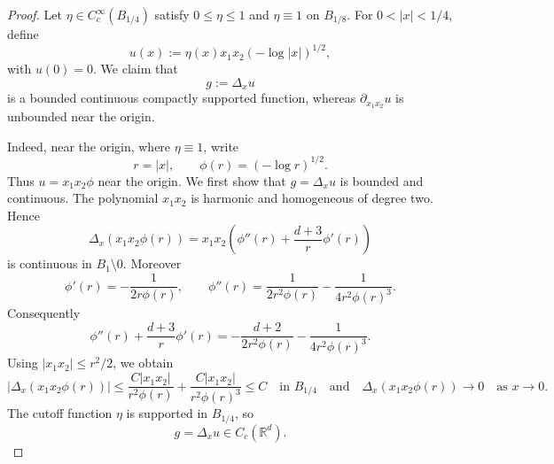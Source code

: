\documentclass[11pt,reqno]{amsart}
\numberwithin{equation}{section}
\theoremstyle{remark}
\newcommand{\R}{\mathbb{R}}
\begin{document}
\begin{proof}
Let \(\eta\in C_c^\infty(B_{1/4})\) satisfy \(0\le\eta\le1\) and
\(\eta\equiv1\) on \(B_{1/8}\).  For \(0<|x|<1/4\), %
define
\begin{equation}\label{eq:potential-u-def}
   u(x):=\eta(x)x_1x_2 (-\log |x|)^{1/2},
\end{equation}
with \(u(0)=0\).  We claim that
\[
   g:=\Delta_x u
\]
is a bounded {continuous} compactly supported function, whereas \(\partial_{x_1x_2}u\) is
unbounded near the origin.

Indeed, near the origin, where \(\eta\equiv1\), write
\[
   r=|x|,
   \qquad
   \phi(r)=(-\log r)^{1/2}.
\]
Thus \(u=x_1x_2\phi\) near the origin.  We first show that
\(g=\Delta_xu\) is bounded {and continuous}.  The polynomial \(x_1x_2\) is harmonic and homogeneous
of degree two.  Hence
\begin{equation}\label{eq:laplacian-Pphi}
   \Delta_x(x_1x_2\phi(r))
   =x_1x_2\left(\phi''(r)+\frac{d+3}{r}\phi'(r)\right)
\end{equation}
is continuous in $B_1\setminus{0}$.
Moreover
\[
   \phi'(r)=-\frac{1}{2r\phi(r)},
   \qquad
   \phi''(r)=\frac{1}{2r^2\phi(r)}
      -\frac{1}{4r^2\phi(r)^3}.
\]
Consequently
\[
   \phi''(r)+\frac{d+3}{r}\phi'(r)
   =-\frac{d+2}{2r^2\phi(r)}
    -\frac{1}{4r^2\phi(r)^3}.
\]
Using \(|x_1x_2|\le r^2/2\), we obtain
\[
   |\Delta_x (x_1x_2\phi(r))|
   \le \frac{C|x_1x_2|}{r^2\phi(r)}
       +\frac{C|x_1x_2|}{r^2\phi(r)^3}
   \le C\quad{\text{in}\,\,B_{1/4}\quad\text{and}\quad
\Delta_x (x_1x_2\phi(r))\to 0\quad\text{as}\,\,x\to 0}.
\]
The cutoff %
{function $\eta$ is supported in $B_{1/4}$}, so
\[
   g=\Delta_xu\in {C_c}(\R^d).
\]


\end{proof}
\end{document}
